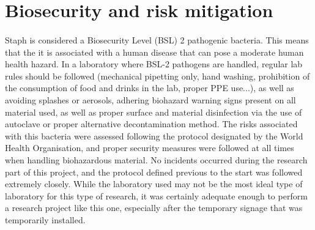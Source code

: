 \section{Biosecurity and risk mitigation}
\paragraph{}Staph is considered a Biosecurity Level (BSL) 2 pathogenic bacteria\cite{cheungPathogenicityVirulenceStaphylococcus2021}. This means that the it is associated with a human disease that can pose a moderate human health hazard. In a laboratory where BSL-2 pathogens are handled, regular lab rules should be followed (mechanical pipetting only, hand washing, prohibition of the consumption of food and drinks in the lab, proper PPE use...), as well as avoiding splashes or aerosols, adhering biohazard warning signs present on all material used, as well as proper surface and material disinfection via the use of autoclave or proper alternative decontamination method\cite{worldhealthorganizationLaboratoryBiosafetyManual2020}.\newline
The risks associated with this bacteria were assessed following the protocol designated by the World Health Organisation, and proper security measures were followed at all times when handling biohazardous material. No incidents occurred during the research part of this project, and the protocol defined previous to the start was followed extremely closely. While the laboratory used may not be the most ideal type of laboratory for this type of research, it was certainly adequate enough to perform a research project like this one, especially after the temporary signage that was temporarily installed.\newpage
